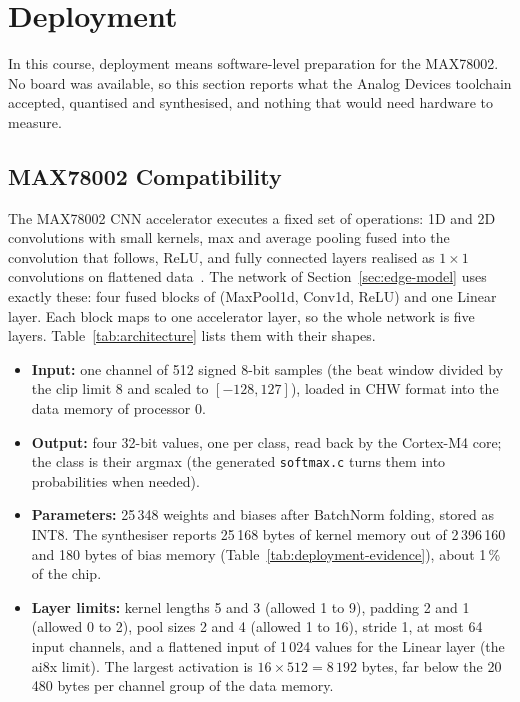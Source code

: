 \section{Deployment}
\label{sec:deployment}

In this course, deployment means software-level preparation for the MAX78002. No board was available, so this section reports what the Analog Devices toolchain accepted, quantised and synthesised, and nothing that would need hardware to measure.

\subsection{MAX78002 Compatibility}
\label{sec:compatibility}

The MAX78002 CNN accelerator executes a fixed set of operations: 1D and 2D convolutions with small kernels, max and average pooling fused into the convolution that follows, ReLU, and fully connected layers realised as $1\times1$ convolutions on flattened data~\cite{ai8xsynthesis}. The network of Section~\ref{sec:edge-model} uses exactly these: four fused blocks of (MaxPool1d, Conv1d, ReLU) and one Linear layer. Each block maps to one accelerator layer, so the whole network is five layers. Table~\ref{tab:architecture} lists them with their shapes.

\begin{itemize}[nosep]
  \item \textbf{Input:} one channel of 512 signed 8-bit samples (the beat window divided by the clip limit 8 and scaled to $[-128, 127]$), loaded in CHW format into the data memory of processor 0.
  \item \textbf{Output:} four 32-bit values, one per class, read back by the Cortex-M4 core; the class is their argmax (the generated \texttt{softmax.c} turns them into probabilities when needed).
  \item \textbf{Parameters:} 25\,348 weights and biases after BatchNorm folding, stored as INT8. The synthesiser reports 25\,168 bytes of kernel memory out of 2\,396\,160 and 180 bytes of bias memory (Table~\ref{tab:deployment-evidence}), about 1\,\% of the chip.
  \item \textbf{Layer limits:} kernel lengths 5 and 3 (allowed 1 to 9), padding 2 and 1 (allowed 0 to 2), pool sizes 2 and 4 (allowed 1 to 16), stride 1, at most 64 input channels, and a flattened input of 1\,024 values for the Linear layer (the ai8x limit). The largest activation is $16 \times 512 = 8\,192$ bytes, far below the 20\,480 bytes per channel group of the data memory.
\end{itemize}

